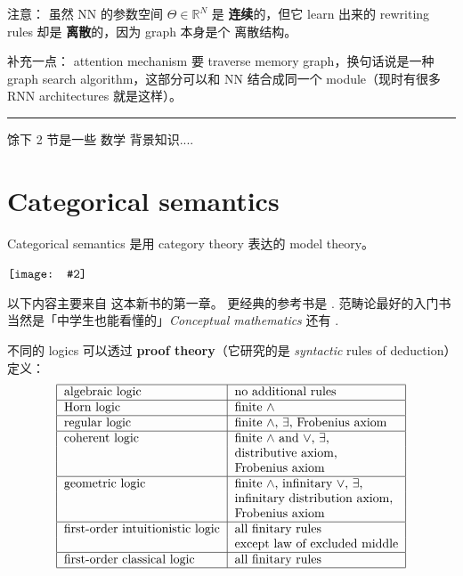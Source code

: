 \documentclass[12pt, orivec]{article}
\newcommand{\book}[1]{$\NewSym[0.4]{../book-icon.png} \quad$ \parbox{0.9\textwidth}{\footnotesize #1}}
\newcommand*\NewSym[2][0.5]{\vcenter{\hbox{\texttt{[image: \#2]}}}}
\begin{document}
注意： 虽然 NN 的参数空间 $\Theta \in \mathbb{R}^N$ 是 \textbf{连续}的，但它 learn 出来的 rewriting rules 却是 \textbf{离散}的，因为 graph 本身是个 离散结构。 

补充一点： attention mechanism 要 traverse memory graph，换句话说是一种 graph search algorithm，这部分可以和 NN 结合成同一个 module（现时有很多 RNN architectures 就是这样）。

\begin{center}
\rule{0.4\textwidth}{.6pt}
\end{center}
馀下 2 节是一些 数学 背景知识....

\section{Categorical semantics}
\label{Categorical-semantics}

Categorical semantics 是用 category theory 表达的 model theory。

\book{以下内容主要来自 \parencite{Caramello2018} 这本新书的第一章。  更经典的参考书是 \parencite{Goldblatt2006}.  范畴论最好的入门书当然是「中学生也能看懂的」\textit{Conceptual mathematics} \parencite{Lawvere1997} 还有 \parencite{Lawvere2003}.}

不同的 logics 可以透过 \textbf{proof theory}（它研究的是 \textit{syntactic} rules of deduction）定义：
\begin{equation}
\begin{tabular}{|l|l|}
\hline
algebraic logic & no additional rules\\
\hline
Horn logic & finite $\wedge$ \\
\hline
regular logic & finite $\wedge$, $\exists$, Frobenius axiom\\
\hline
coherent logic & finite $\wedge$ and $\vee$, $\exists$,\\
				& distributive axiom, \\
				& Frobenius axiom \\
\hline
geometric logic & finite $\wedge$, infinitary $\vee$, $\exists$,\\
				& infinitary distribution axiom,\\
				& Frobenius axiom \\
\hline
first-order intuitionistic logic & all finitary rules \\
				& except law of excluded middle\\
\hline
first-order classical logic & all finitary rules \\
\hline
\end{tabular}
\end{equation}
\end{document}
